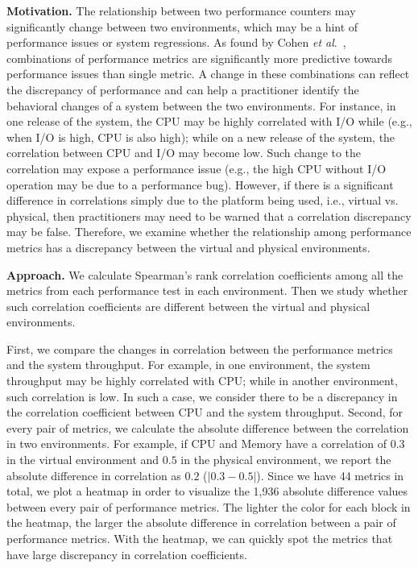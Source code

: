 \documentclass[smallextended]{svjour3}       %
\begin{document}
\noindent \textbf{Motivation.}
The relationship between two performance counters may significantly change between two environments, which may be a hint of performance issues or system regressions. 
As found by Cohen \emph{et al$.$}~\cite{cohen2004correlating}, combinations of performance metrics are significantly more predictive towards performance issues than single metric. A change in these combinations can reflect the discrepancy of performance and can help a practitioner identify the behavioral changes of a system between the two environments. For instance, in one release of the system, the CPU may be highly correlated with I/O while (e.g., when I/O is high, CPU is also high); while on a new release of the system, the correlation between CPU and I/O may become low. Such change to the correlation may expose a performance issue (e.g., the high CPU without I/O operation may be due to a performance bug). However, if there is a significant difference in correlations simply due to the platform being used, i.e., virtual vs. physical, then practitioners may need to be warned that a correlation discrepancy may be false. Therefore, we examine whether the relationship among performance metrics has a discrepancy between the virtual and physical environments. 


\noindent \textbf{Approach.} 
We calculate Spearman's rank correlation coefficients among all the metrics from each performance test in each environment. Then we study whether such correlation coefficients are different between the virtual and physical environments. 

First, we compare the changes in correlation between the performance metrics and the system throughput. For example, in one environment, the system throughput may be highly correlated with CPU; while in another environment, such correlation is low. In such a case, we consider there to be a discrepancy in the correlation coefficient between CPU and the system throughput. Second, for every pair of metrics, we calculate the absolute difference between the correlation in two environments. For example, if CPU and Memory have a correlation of $0.3$ in the virtual environment and $0.5$ in the physical environment, we report the absolute difference in correlation as $0.2$ ($|0.3-0.5|$). Since we have 44 metrics in total, we plot a heatmap in order to visualize the 1,936 absolute difference values between every pair of performance metrics. The lighter the color for each block in the heatmap, the larger the absolute difference in correlation between a pair of performance metrics. With the heatmap, we can quickly spot the metrics that have large discrepancy in correlation coefficients. 
\end{document}
